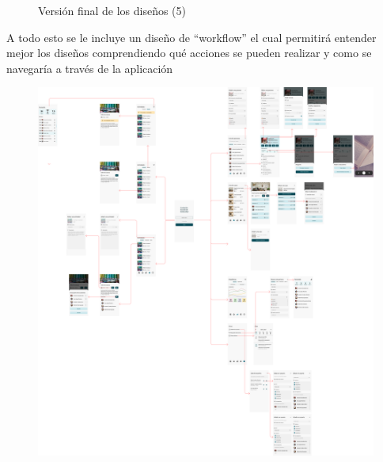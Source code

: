 \begin{figure}[H]
    \caption{Versión final de los diseños (5)}
    \label{fig:dis-fin5}

\end{figure}

\newpage

A todo esto se le incluye un diseño de ``workflow'' el cual permitirá entender mejor los diseños comprendiendo qué acciones se pueden realizar y como se navegaría a través de la aplicación

\begin{figure}[h!]
    \centering
    \includegraphics[width=\linewidth]{diseno/app/presentacion/workflow.png}
\end{figure}
